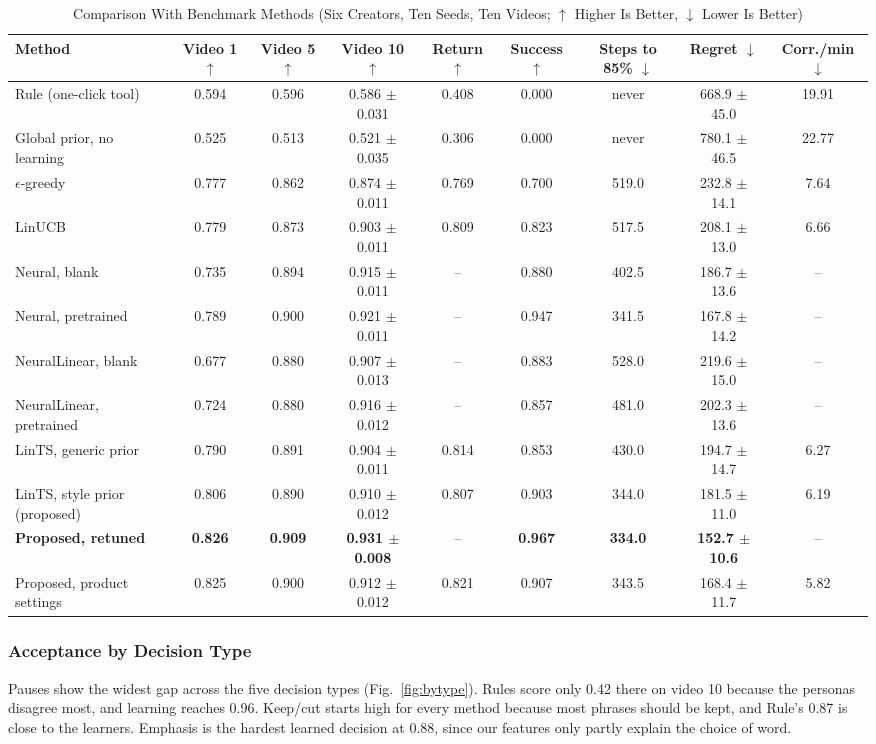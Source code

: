 \documentclass{ieeeaccess}
\begin{document}
\begin{table}[t]
\caption{Comparison With Benchmark Methods (Six Creators, Ten Seeds, Ten Videos; $\uparrow$ Higher Is Better, $\downarrow$ Lower Is Better)}
\label{tab:compare}
\setlength{\tabcolsep}{3.5pt}
\centering
\begin{tabular}{|l|c|c|c|c|c|c|c|c|}
\hline
Method & Video 1 $\uparrow$ & Video 5 $\uparrow$ & Video 10 $\uparrow$ & Return $\uparrow$ & Success $\uparrow$ & Steps to 85\% $\downarrow$ & Regret $\downarrow$ & Corr./min $\downarrow$ \\
\hline
Rule (one-click tool) & 0.594 & 0.596 & 0.586 $\pm$ 0.031 & 0.408 & 0.000 & never & 668.9 $\pm$ 45.0 & 19.91 \\
Global prior, no learning & 0.525 & 0.513 & 0.521 $\pm$ 0.035 & 0.306 & 0.000 & never & 780.1 $\pm$ 46.5 & 22.77 \\
$\epsilon$-greedy & 0.777 & 0.862 & 0.874 $\pm$ 0.011 & 0.769 & 0.700 & 519.0 & 232.8 $\pm$ 14.1 & 7.64 \\
LinUCB & 0.779 & 0.873 & 0.903 $\pm$ 0.011 & 0.809 & 0.823 & 517.5 & 208.1 $\pm$ 13.0 & 6.66 \\
Neural, blank & 0.735 & 0.894 & 0.915 $\pm$ 0.011 & -- & 0.880 & 402.5 & 186.7 $\pm$ 13.6 & -- \\
Neural, pretrained & 0.789 & 0.900 & 0.921 $\pm$ 0.011 & -- & 0.947 & 341.5 & 167.8 $\pm$ 14.2 & -- \\
NeuralLinear, blank & 0.677 & 0.880 & 0.907 $\pm$ 0.013 & -- & 0.883 & 528.0 & 219.6 $\pm$ 15.0 & -- \\
NeuralLinear, pretrained & 0.724 & 0.880 & 0.916 $\pm$ 0.012 & -- & 0.857 & 481.0 & 202.3 $\pm$ 13.6 & -- \\
LinTS, generic prior & 0.790 & 0.891 & 0.904 $\pm$ 0.011 & 0.814 & 0.853 & 430.0 & 194.7 $\pm$ 14.7 & 6.27 \\
LinTS, style prior (proposed) & 0.806 & 0.890 & 0.910 $\pm$ 0.012 & 0.807 & 0.903 & 344.0 & 181.5 $\pm$ 11.0 & 6.19 \\
\textbf{Proposed, retuned} & \textbf{0.826} & \textbf{0.909} & \textbf{0.931 $\pm$ 0.008} & -- & \textbf{0.967} & \textbf{334.0} & \textbf{152.7 $\pm$ 10.6} & -- \\
Proposed, product settings & 0.825 & 0.900 & 0.912 $\pm$ 0.012 & 0.821 & 0.907 & 343.5 & 168.4 $\pm$ 11.7 & 5.82 \\
\hline
\end{tabular}
\end{table}

\subsubsection{Acceptance by Decision Type}
Pauses show the widest gap across the five decision types (Fig.~\ref{fig:bytype}). Rules score only 0.42 there on video 10 because the personas disagree most, and learning reaches 0.96. Keep/cut starts high for every method because most phrases should be kept, and Rule's 0.87 is close to the learners. Emphasis is the hardest learned decision at 0.88, since our features only partly explain the choice of word.
\end{document}
